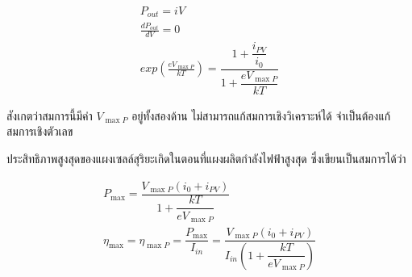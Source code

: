 \documentclass[a4paper,nobib,openany]{tufte-book}
\begin{document}
\begin{align}
\label{eq:orgb7bf346}
  P_{out} = i V \\
  \frac{dP_{out}}{dV} = 0 \\
  exp \left(\frac{e V_{\max P}}{kT} \right) = \dfrac{1+\dfrac{i_{PV}}{i_0}}{1+ \dfrac{e V_{\max P}}{kT}}
\end{align}

สังเกตว่าสมการนี้มีค่า \(V_{\max P}\) อยู่ทั้งสองด้าน
ไม่สามารถแก้สมการเชิงวิเคราะห์ได้ จำเป็นต้องแก้สมการเชิงตัวเลข

ประสิทธิภาพสูงสุดของแผงเซลล์สุริยะเกิดในตอนที่แผงผลิตกำลังไฟฟ้าสูงสุด
ซึ่งเขียนเป็นสมการได้ว่า

\begin{gather*}
\label{eq:orge17486e}
  P_{\max} =  \dfrac{V_{\max P} ( i_0 + i_{PV} )}{1 + \dfrac{kT}{e V_{\max P}}} \\
  \eta_{\max} = \eta_{\max P} =  \dfrac{P_{\max}}{I_{in}} = \dfrac{V_{\max P} ( i_0 + i_{PV} )}{I_{in} \left(1 + \dfrac{kT}{e V_{\max P}} \right)}
\end{gather*}
\end{document}
